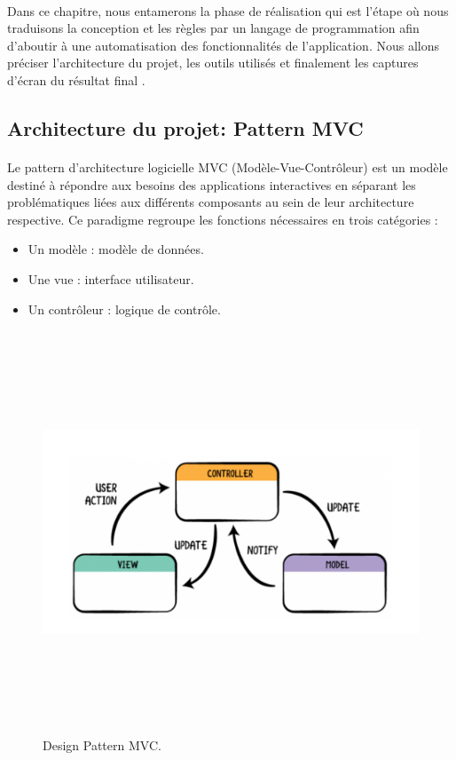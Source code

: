 \documentclass{article}
\begin{document}
{\onehalfspacing\paragraph{}{Dans ce chapitre, nous
entamerons la phase de réalisation qui est l'étape où nous traduisons la conception et les règles par un langage
de programmation afin d'aboutir à une automatisation des fonctionnalités de l'application. Nous allons préciser l'architecture du projet, les outils utilisés et finalement les captures d'écran du résultat final
  .}
\newline
\subsection{Architecture du projet: Pattern MVC}
\onehalfspacing\paragraph{}{Le pattern d'architecture logicielle MVC (Modèle-Vue-Contrôleur) est un modèle destiné à répondre aux
besoins des applications interactives en séparant les problématiques liées aux différents composants au sein de
leur architecture respective. Ce paradigme regroupe les fonctions nécessaires en trois catégories :
}
\vspace{0.5cm}
\begin{itemize}[label=\textbullet]
        \item Un modèle : modèle de données.
        \item Une vue : interface utilisateur.
        \item Un contrôleur : logique de contrôle.
\end{itemize}
\begin{figure}[H]
    \centering
    \includegraphics[width=17cm,height=12cm]{mvc.PNG}
    \caption{Design Pattern MVC.}
    \label{fig:Design Pattern MVC.}
\end{figure}
}
\end{document}
